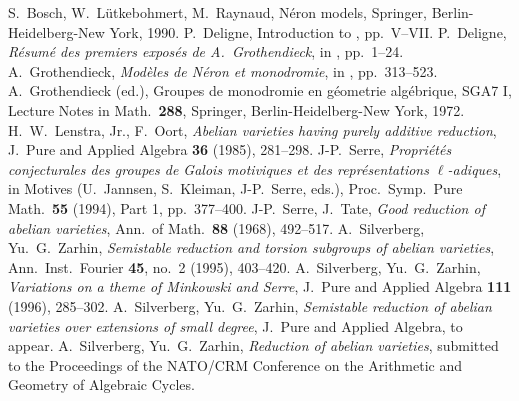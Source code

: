 \documentclass{amsart}
\theoremstyle{definition}
\begin{document}
\begin{thebibliography}{99}

 S.\ Bosch, W.\ L\"utkebohmert, M.\ Raynaud, N\'eron models,
Springer, Berlin-Heidelberg-New York, 1990.
 P.\ Deligne, 
Introduction to \cite{SGA7I}, pp.\ V--VII.
 P.\ Deligne, 
{\em R\'esum\'e des premiers expos\'es de A.\ Grothendieck},
in \cite{SGA7I}, pp.\ 1--24.
 A.\ Grothendieck, {\em Mod\`eles de N\'eron et monodromie},
in \cite{SGA7I}, pp.\ 313--523.
 A.\ Grothendieck (ed.), 
Groupes de monodromie en g\'eometrie alg\'ebrique, SGA7 I,
Lecture Notes in Math.\ {\bf 288}, Springer,
Berlin-Heidelberg-New York, 1972.
 H.\ W.\  Lenstra, Jr., F.\ Oort, {\em Abelian varieties
having purely additive reduction}, J.\ Pure and Applied Algebra {\bf 36}
(1985), 281--298.
 J-P.\ Serre, {\em Propri\'et\'es conjecturales 
des groupes de Galois motiviques et des repr\'esentations $\ell$-adiques}, 
in Motives 
(U.\ Jannsen, S.\ Kleiman, J-P.\ Serre, eds.), Proc.\ Symp.\ Pure 
Math.\ {\bf 55} (1994), Part 1, pp.~377--400.
 J-P.\ Serre, J.\ Tate, {\em Good reduction of abelian 
varieties}, Ann.\ of Math.\ {\bf 88} (1968), 492--517. 
 A.\ Silverberg, Yu.\ G.\ Zarhin, 
{\em Semistable reduction 
and torsion subgroups of abelian varieties}, 
Ann.\ Inst.\ Fourier {\bf 45}, no.~2 (1995), 403--420.
 A.\ Silverberg, Yu.\ G.\ Zarhin, 
{\em Variations on a theme of Minkowski and Serre},
J.\ Pure and Applied Algebra {\bf 111}  (1996),  285--302.
 A.\ Silverberg, Yu.\ G.\ Zarhin, 
{\em Semistable reduction of abelian varieties over extensions of 
small degree},
J.\ Pure and Applied Algebra, to appear.
 A.\ Silverberg, Yu.\ G.\ Zarhin, 
{\em Reduction of abelian varieties}, 
submitted to the Proceedings of the NATO/CRM Conference  
on the Arithmetic and Geometry of Algebraic Cycles.


\end{thebibliography}
\end{document}
